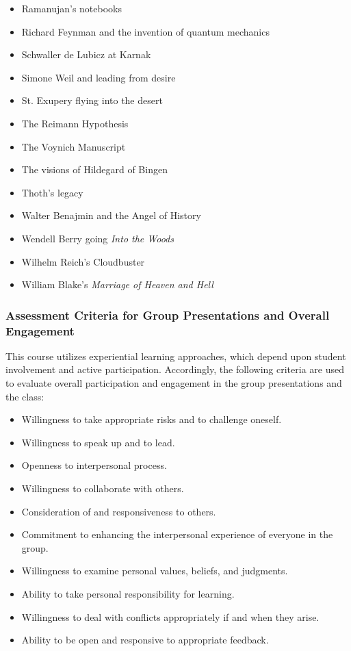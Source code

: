 \documentclass[letterpaper,10pt,headsepline]{scrreprt}
\begin{document}
\begin{itemize}
\item Ramanujan's notebooks
\item Richard Feynman and the invention of quantum mechanics
\item Schwaller de Lubicz at Karnak
\item Simone Weil and leading from desire
\item St. Exupery flying into the desert
\item The Reimann Hypothesis
\item The Voynich Manuscript
\item The visions of Hildegard of Bingen
\item Thoth's legacy
\item Walter Benajmin and the Angel of History
\item Wendell Berry going \textit{Into the Woods}
\item Wilhelm Reich's Cloudbuster
\item William Blake's \textit{Marriage of Heaven and Hell}

\end{itemize}

\subsubsection{Assessment Criteria for Group Presentations and Overall Engagement}

This course utilizes experiential learning approaches, which depend upon student involvement and active participation. Accordingly, the following criteria are used to evaluate overall participation and engagement in the group presentations and the class:

\begin{itemize}
\item Willingness to take appropriate risks and to challenge oneself.
\item Willingness to speak up and to lead.
\item Openness to interpersonal process.
\item Willingness to collaborate with others.
\item Consideration of and responsiveness to others.
\item Commitment to enhancing the interpersonal experience of everyone in the group.
\item Willingness to examine personal values, beliefs, and judgments.
\item Ability to take personal responsibility for learning.
\item Willingness to deal with conflicts appropriately if and when they arise.
\item Ability to be open and responsive to appropriate feedback.
 
\end{itemize}
\end{document}
